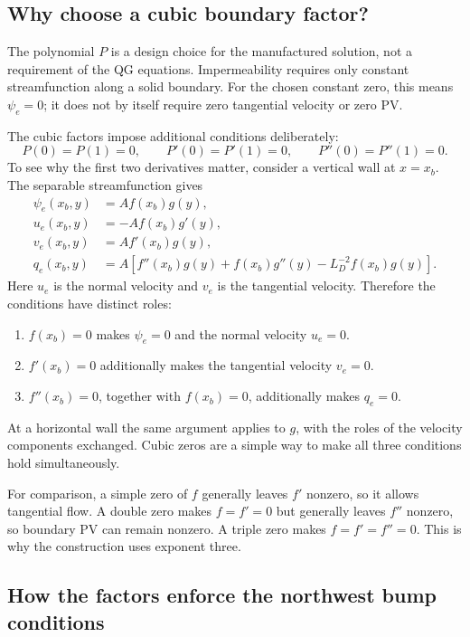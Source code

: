 \documentclass[11pt]{article}
\begin{document}
\subsection{Why choose a cubic boundary factor?}

The polynomial $P$ is a design choice for the manufactured solution,
not a requirement of the QG equations.  Impermeability requires only
constant streamfunction along a solid boundary.  For the chosen constant
zero, this means $\psi_e=0$; it does not by itself require zero tangential
velocity or zero PV.

The cubic factors impose additional conditions deliberately:
\[
 P(0)=P(1)=0,\qquad
 P'(0)=P'(1)=0,\qquad
 P''(0)=P''(1)=0.
\]
To see why the first two derivatives matter, consider a vertical wall at
$x=x_b$.  The separable streamfunction gives
\begin{align}
 \psi_e(x_b,y)&=A f(x_b)g(y),\\
 u_e(x_b,y)&=-A f(x_b)g'(y),\\
 v_e(x_b,y)&=A f'(x_b)g(y),\\
 q_e(x_b,y)&=A\left[f''(x_b)g(y)+f(x_b)g''(y)
                         -L_D^{-2}f(x_b)g(y)\right].
\end{align}
Here $u_e$ is the normal velocity and $v_e$ is the tangential velocity.
Therefore the conditions have distinct roles:
\begin{enumerate}
 \item $f(x_b)=0$ makes $\psi_e=0$ and the normal velocity $u_e=0$.
 \item $f'(x_b)=0$ additionally makes the tangential velocity $v_e=0$.
 \item $f''(x_b)=0$, together with $f(x_b)=0$, additionally makes $q_e=0$.
\end{enumerate}
At a horizontal wall the same argument applies to $g$, with the roles of
the velocity components exchanged.  Cubic zeros are a simple way to make
all three conditions hold simultaneously.

For comparison, a simple zero of $f$ generally leaves $f'$ nonzero, so it
allows tangential flow.  A double zero makes $f=f'=0$ but generally leaves
$f''$ nonzero, so boundary PV can remain nonzero.  A triple zero makes
$f=f'=f''=0$.  This is why the construction uses exponent three.

\subsection{How the factors enforce the northwest bump conditions}
\end{document}
